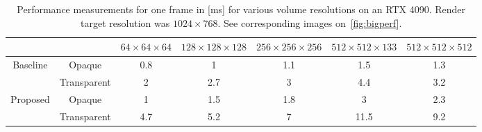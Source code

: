 \documentclass[journal]{vgtc}                     %
\begin{document}
\begin{table}[t!]
	\caption{Performance measurements for one frame in [ms] for various volume resolutions on an RTX 4090. Render target resolution was $1024 \times 768$. See corresponding images on~\cref{fig:bigperf}.}
	\label{tab:performance4nvidia}
	\centering
	\begin{tabular}{ccccccc} \toprule
		& & $64 \times 64 \times 64$ & $128 \times 128 \times 128$ & $256 \times 256 \times 256$ & $512 \times 512 \times 133$ & $512 \times 512 \times 512$ \\
		\midrule
		\multirow{2}{*}{Baseline} & Opaque & 0.8  & 1 & 1.1 & 1.5 & 1.3 \\
		& Transparent   	               & 2 & 2.7 & 3 & 4.4 & 3.2  \\ 
		\midrule
		\multirow{2}{*}{Proposed} & Opaque & 1 & 1.5 & 1.8 & 3 & 2.3 \\
						    & Transparent  & 4.7 & 5.2 & 7 & 11.5 & 9.2 \\ 
		\bottomrule
	\end{tabular}
\end{table}

\end{document}

